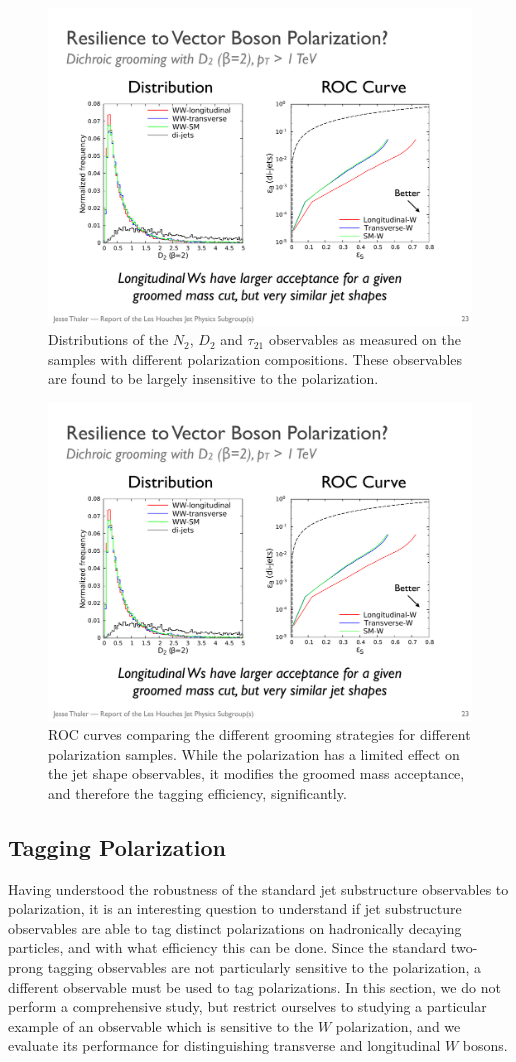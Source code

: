 \documentclass[11pt,letterpaper]{article}
\begin{document}
\begin{figure}
\begin{center}
\includegraphics[width=0.3\columnwidth]{figures/D2_polarization}
\end{center}
\caption{Distributions of the $N_2$, $D_2$ and $\tau_{21}$ observables as measured on the samples with different polarization compositions. These observables are found to be largely insensitive to the polarization.}
\end{figure}

\begin{figure}
\begin{center}
\includegraphics[width=0.3\columnwidth]{figures/ROC_polarization}
\end{center}
\caption{ROC curves comparing the different grooming strategies for different polarization samples. While the polarization has a limited effect on the jet shape observables, it modifies the groomed mass acceptance, and therefore the tagging efficiency, significantly.}
\end{figure}

\subsection{Tagging Polarization}\label{sec:polar_tag}

Having understood the robustness of the standard jet substructure observables to polarization, it is an interesting question to understand if jet substructure observables are able to tag distinct polarizations on hadronically decaying particles, and with what efficiency this can be done.
%
Since the standard two-prong tagging observables are not particularly sensitive to the polarization, a different observable must be used to tag polarizations.
%
In this section, we do not perform a comprehensive study, but restrict ourselves to studying a particular example of an observable which is sensitive to the $W$ polarization, and we evaluate its performance for distinguishing transverse and longitudinal $W$ bosons. 
\end{document}
